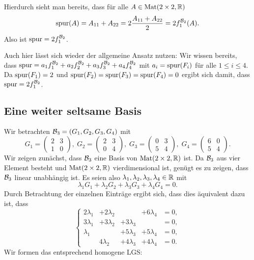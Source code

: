 \documentclass[a4paper,10pt]{article}
\begin{document}
Hierdurch sieht man bereits, dass für alle $A \in \mathrm{Mat}(2 \times 2, \mathbb{R})$
\[
 \mathrm{spur}(A)
 = A_{11} + A_{22}
 = 2 \frac{A_{11} + A_{22}}{2}
 = 2 f^{\mathcal{B}_2}_1(A).
\]
Also ist $\mathrm{spur} = 2f^{\mathcal{B}_2}_1$.

Auch hier lässt sich wieder der allgemeine Ansatz nutzen: Wir wissen bereits, dass $\mathrm{spur} = a_1 f^{\mathcal{B}_2}_1 + a_2 f^{\mathcal{B}_2}_2 + a_3 f^{\mathcal{B}_2}_3 + a_4 f^{\mathcal{B}_2}_4$ mit $a_i = \mathrm{spur}(F_i)$ für alle $1 \leq i \leq 4$. Da $\mathrm{spur}(F_1) = 2$ und $\mathrm{spur}(F_2) = \mathrm{spur}(F_3) = \mathrm{spur}(F_4) = 0$ ergibt sich damit, dass $\mathrm{spur} = 2 f^{\mathcal{B}_2}_1$.


\subsection{Eine weiter seltsame Basis}
Wir betrachten $\mathcal{B}_3 = (G_1, G_2, G_3, G_4)$ mit
\[
 G_1 = \begin{pmatrix} 2 & 3 \\ 1 & 0 \end{pmatrix}, \;
 G_2 = \begin{pmatrix} 2 & 3 \\ 0 & 4 \end{pmatrix}, \;
 G_3 = \begin{pmatrix} 0 & 3 \\ 5 & 4 \end{pmatrix}, \;
 G_4 = \begin{pmatrix} 6 & 0 \\ 5 & 4 \end{pmatrix}.
\]
Wir zeigen zunächst, dass $\mathcal{B}_3$ eine Basis von $\mathrm{Mat}(2 \times 2, \mathbb{R})$ ist. Da $\mathcal{B}_3$ aus vier Element besteht und $\mathrm{Mat}(2 \times 2, \mathbb{R})$ vierdimensional ist, genügt es zu zeigen, dass $\mathcal{B}_3$ linear unabhängig ist. Es seien also $\lambda_1, \lambda_2, \lambda_3, \lambda_4 \in \mathbb{R}$ mit
\[
 \lambda_1 G_1 + \lambda_2 G_2 + \lambda_3 G_3 + \lambda_4 G_4 = 0.
\]
Durch Betrachtung der einzelnen Einträge ergibt sich, dass dies äquivalent dazu ist, dass
\[
 \left\{
  \begin{matrix}
   2\lambda_1 & +2\lambda_2 &             & +6\lambda_4 & = 0, \\
   3\lambda_1 & +3\lambda_2 & +3\lambda_3 &             & = 0, \\
    \lambda_1 &             & +5\lambda_3 & +5\lambda_4 & = 0, \\
              & 4\lambda_2  & +4\lambda_3 & +4\lambda_4 & = 0.
  \end{matrix}
  \right.
\]
Wir formen das entsprechend homogene LGS:
\end{document}
